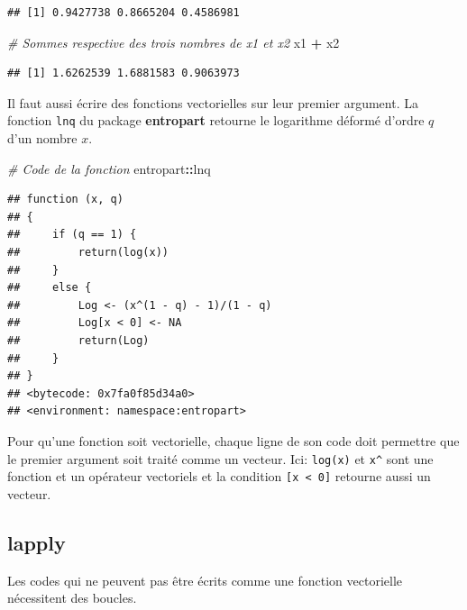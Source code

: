 \documentclass[
  12pt,
  french,
  a4paper,
  extrafontsizes,onecolumn,openright
  ]{memoir}
\newenvironment{Shaded}{\begin{snugshade}}{\end{snugshade}}
\newcommand{\CommentTok}[1]{\textcolor[rgb]{0.56,0.35,0.01}{\textit{#1}}}
\newcommand{\NormalTok}[1]{#1}
\newcommand{\OperatorTok}[1]{\textcolor[rgb]{0.81,0.36,0.00}{\textbf{#1}}}
\newcommand{\StringTok}[1]{\textcolor[rgb]{0.31,0.60,0.02}{#1}}
\begin{document}
\begin{verbatim}
## [1] 0.9427738 0.8665204 0.4586981
\end{verbatim}

\begin{Shaded}
\begin{Highlighting}[]
\CommentTok{# Sommes respective des trois nombres de x1 et x2}
\NormalTok{x1 }\OperatorTok{+}\StringTok{ }\NormalTok{x2}
\end{Highlighting}
\end{Shaded}

\begin{verbatim}
## [1] 1.6262539 1.6881583 0.9063973
\end{verbatim}

\normalsize

Il faut aussi écrire des fonctions vectorielles sur leur premier argument.
La fonction \texttt{lnq} du package \textbf{entropart} retourne le logarithme déformé d'ordre \(q\) d'un nombre \(x\).

\scriptsize

\begin{Shaded}
\begin{Highlighting}[]
\CommentTok{# Code de la fonction}
\NormalTok{entropart}\OperatorTok{::}\NormalTok{lnq}
\end{Highlighting}
\end{Shaded}

\begin{verbatim}
## function (x, q) 
## {
##     if (q == 1) {
##         return(log(x))
##     }
##     else {
##         Log <- (x^(1 - q) - 1)/(1 - q)
##         Log[x < 0] <- NA
##         return(Log)
##     }
## }
## <bytecode: 0x7fa0f85d34a0>
## <environment: namespace:entropart>
\end{verbatim}

\normalsize

Pour qu'une fonction soit vectorielle, chaque ligne de son code doit permettre que le premier argument soit traité comme un vecteur.
Ici: \texttt{log(x)} et \texttt{x\^{}} sont une fonction et un opérateur vectoriels et la condition \texttt{{[}x\ \textless{}\ 0{]}} retourne aussi un vecteur.

\hypertarget{lapply}{%
\subsection{lapply}\label{lapply}}

Les codes qui ne peuvent pas être écrits comme une fonction vectorielle nécessitent des boucles.
\end{document}
